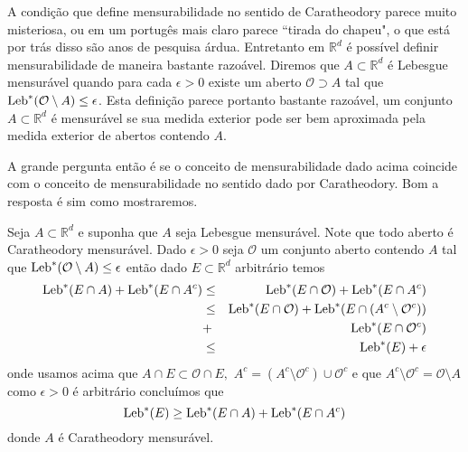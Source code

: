A condição que define mensurabilidade no sentido de 
Caratheodory parece muito misteriosa, ou em 
um portugês mais claro 
parece ``tirada do chapeu", o que está por 
trás disso são anos de pesquisa árdua. 
Entretanto em $\mathbb{R}^d$ é possível definir 
mensurabilidade de maneira bastante razoável. 
Diremos que $A\subset \mathbb{R}^d$ é Lebesgue  
mensurável quando para cada  $\epsilon>0$ 
existe um aberto $\mathcal{O}\supset A$ 
tal que $\textnormal{Leb}^{*}(\mathcal{O}\setminus A)\leq \epsilon$. 
Esta definição parece portanto bastante razoável, 
um conjunto $A\subset \mathbb{R}^d$ é mensurável 
se sua medida exterior  pode ser bem aproximada 
pela medida exterior de abertos contendo $A$.

A grande pergunta então é se o conceito de 
mensurabilidade dado acima coincide com o 
conceito de mensurabilidade 
no sentido dado por Caratheodory. 
Bom  a resposta é sim como mostraremos.



Seja $A\subset \mathbb{R}^d$ e suponha que $A$ 
seja Lebesgue mensurável. 
Note que todo aberto 
é Caratheodory mensurável. 
Dado $\epsilon>0$ seja $\mathcal{O}$ um 
conjunto aberto contendo $A$ 
tal que 
$\textnormal{Leb}^{*}(\mathcal{O}\setminus A)\leq \epsilon$  
então dado $E\subset \mathbb{R}^d$ 
arbitrário temos 
\begin{eqnarray*}
\textnormal{Leb}^{*}(E\cap A)+\textnormal{Leb}^{*}(E\cap A^c)
&\leq& 
\textnormal{Leb}^{*}(E\cap \mathcal{O})+\textnormal{Leb}^{*}(E\cap A^c)
\\
&
\leq 
&
\textnormal{Leb}^{*}(E\cap\mathcal{O})+
\textnormal{Leb}^{*}(E\cap (A^c\setminus \mathcal{O}^c))
\\
&
+
&
 \textnormal{Leb}^{*}(E\cap \mathcal{O}^c)
 \\
 &
 \leq 
 &
\textnormal{Leb}^{*}(E)+\epsilon
\end{eqnarray*}
onde usamos acima que 
$
A\cap E\subset \mathcal{O}\cap E,$ $A^c
=
(A^c\setminus \mathcal{O}^c)\cup \mathcal{O}^c
$ 
e que 
$
A^c\setminus \mathcal{O}^c=\mathcal{O}\setminus A$ como 
$\epsilon>0$ é arbitrário concluímos que
$$
\textnormal{Leb}^{*}(E)\geq \textnormal{Leb}^{*}(E\cap A)+\textnormal{Leb}^{*}(E\cap A^c)
$$
donde $A$ é Caratheodory mensurável.


